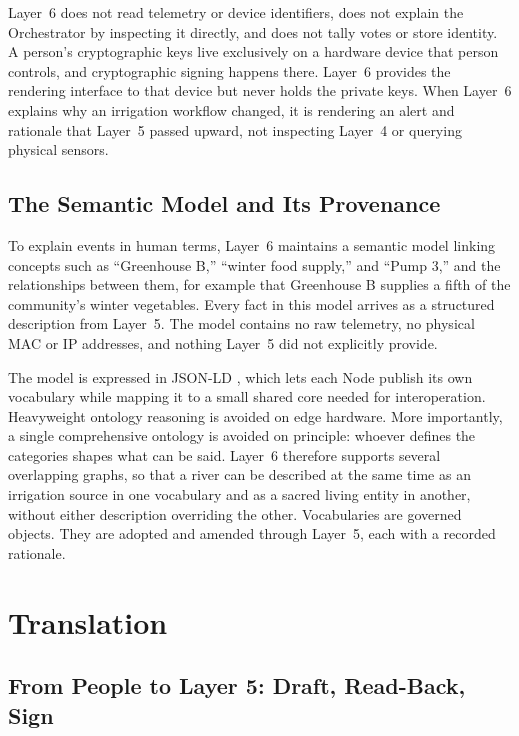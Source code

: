 Layer~6 does not read telemetry or device identifiers, does not explain the Orchestrator by inspecting it directly, and does not tally votes or store identity. A person's cryptographic keys live exclusively on a hardware device that person controls, and cryptographic signing happens there. Layer~6 provides the rendering interface to that device but never holds the private keys. When Layer~6 explains why an irrigation workflow changed, it is rendering an alert and rationale that Layer~5 passed upward, not inspecting Layer~4 or querying physical sensors.

\subsection{The Semantic Model and Its Provenance}

To explain events in human terms, Layer~6 maintains a semantic model linking concepts such as ``Greenhouse B,'' ``winter food supply,'' and ``Pump 3,'' and the relationships between them, for example that Greenhouse B supplies a fifth of the community's winter vegetables. Every fact in this model arrives as a structured description from Layer~5. The model contains no raw telemetry, no physical MAC or IP addresses, and nothing Layer~5 did not explicitly provide.

The model is expressed in JSON-LD \parencite{w3c2020jsonld}, which lets each Node publish its own vocabulary while mapping it to a small shared core needed for interoperation. Heavyweight ontology reasoning is avoided on edge hardware. More importantly, a single comprehensive ontology is avoided on principle: whoever defines the categories shapes what can be said. Layer~6 therefore supports several overlapping graphs, so that a river can be described at the same time as an irrigation source in one vocabulary and as a sacred living entity in another, without either description overriding the other. Vocabularies are governed objects. They are adopted and amended through Layer~5, each with a recorded rationale.

\section{Translation}

\subsection{From People to Layer 5: Draft, Read-Back, Sign}


